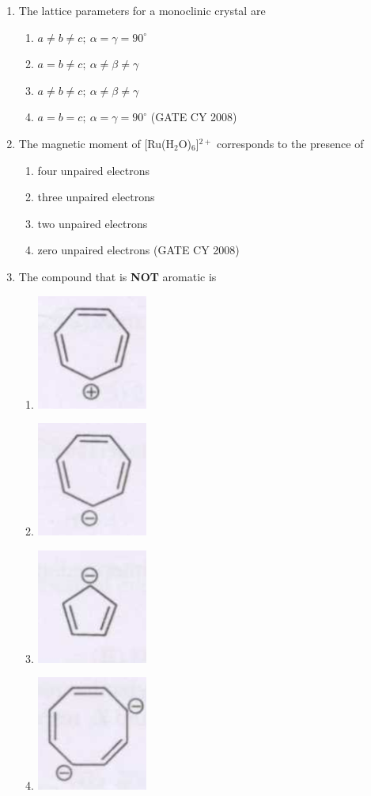 \documentclass[12pt]{article}
\begin{document}
\begin{enumerate}
\item  The lattice parameters for a monoclinic crystal are
\begin{enumerate}
    \item  $a \neq b \neq c; \ \alpha = \gamma = 90^\circ$
    \item  $a = b \neq c; \ \alpha \neq \beta \neq \gamma$
    \item $a \neq b \neq c; \ \alpha \neq \beta \neq \gamma$\
    \item  $a = b = c; \ \alpha = \gamma = 90^\circ$    \hfill{(GATE CY 2008)}
\end{enumerate}
    



    \item The magnetic moment of [Ru(H$_2$O)$_6$]$^{2+}$
 corresponds to the presence of
    \begin{enumerate}
    \item  four unpaired electrons 
    \item  three unpaired electrons
    \item  two unpaired electrons 
    \item  zero unpaired electrons    \hfill{(GATE CY 2008)}
    \end{enumerate}

    

    \item  The compound that is \textbf{NOT} aromatic is
\begin{enumerate}
    \item \includegraphics[width=0.1\columnwidth]{figs/q7 a.png} 
    \item \includegraphics[width=0.1\columnwidth]{figs/q7 b.png} 
    \item \includegraphics[width=0.1\columnwidth]{figs/q7 c.png} 
    \item \includegraphics[width=0.1\columnwidth]{figs/q7 d.png} 
\end{enumerate}



\end{enumerate}
\end{document}
